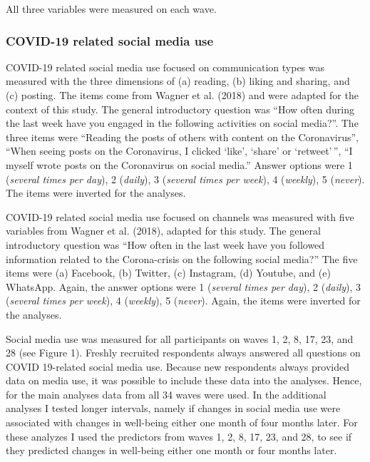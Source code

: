 \documentclass[
  man,mask,floatsintext]{apa7}
\begin{document}
All three variables were measured on each wave.

\hypertarget{covid-19-related-social-media-use}{%
\subsubsection{COVID-19 related social media use}\label{covid-19-related-social-media-use}}

COVID-19 related social media use focused on communication types was measured with the three dimensions of (a) reading, (b) liking and sharing, and (c) posting.
The items come from Wagner et al. (2018) and were adapted for the context of this study.
The general introductory question was ``How often during the last week have you engaged in the following activities on social media?''.
The three items were ``Reading the posts of others with content on the Coronavirus'', ``When seeing posts on the Coronavirus, I clicked `like', `share' or `retweet'\,'', ``I myself wrote posts on the Coronavirus on social media.''
Answer options were 1 (\emph{several times per day}), 2 (\emph{daily}), 3 (\emph{several times per week}), 4 (\emph{weekly}), 5 (\emph{never}).
The items were inverted for the analyses.

COVID-19 related social media use focused on channels was measured with five variables from Wagner et al. (2018), adapted for this study.
The general introductory question was ``How often in the last week have you followed information related to the Corona-crisis on the following social media?''
The five items were (a) Facebook, (b) Twitter, (c) Instagram, (d) Youtube, and (e) WhatsApp.
Again, the answer options were 1 (\emph{several times per day}), 2 (\emph{daily}), 3 (\emph{several times per week}), 4 (\emph{weekly}), 5 (\emph{never}).
Again, the items were inverted for the analyses.

Social media use was measured for all participants on waves 1, 2, 8, 17, 23, and 28 (see Figure 1).
Freshly recruited respondents always answered all questions on COVID 19-related social media use.
Because new respondents always provided data on media use, it was possible to include these data into the analyses.
Hence, for the main analyses data from all 34 waves were used.
In the additional analyses I tested longer intervals, namely if changes in social media use were associated with changes in well-being either one month of four months later.
For these analyzes I used the predictors from waves 1, 2, 8, 17, 23, and 28, to see if they predicted changes in well-being either one month or four months later.
\end{document}

